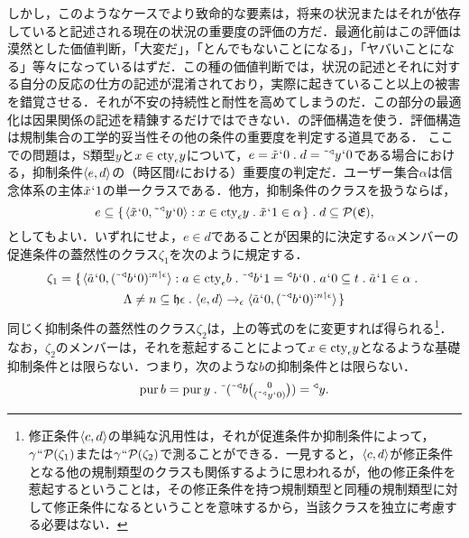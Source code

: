しかし，このようなケースでより致命的な要素は，将来の状況またはそれが依存していると記述される現在の状況の重要度の評価の方だ．最適化前はこの評価は漠然とした価値判断，「大変だ」，「とんでもないことになる」，「ヤバいことになる」等々になっているはずだ．この種の価値判断では，状況の記述とそれに対する自分の反応の仕方の記述が混淆されており，実際に起きていること以上の被害を錯覚させる．それが不安の持続性と耐性を高めてしまうのだ．この部分の最適化は因果関係の記述を精錬するだけではできない．の評価構造を使う．評価構造は規制集合の工学的妥当性その他の条件の重要度を判定する道具である．
ここでの問題は，S類型$y$と$ x\in\mathrm{cty}_{\epsilon}y $について，$ e = \tilde{x}\fap 0\con{1}d = \tildel{\trgl{y}}\fap 0 $である場合における，抑制条件$\langle e,d \rangle$の（時区間$t$における）重要度の判定だ．ユーザー集合$\alpha$は信念体系の主体$ \tilde{x}{\mspace{1mu}{`}\mspace{1mu}} 1 $の単一クラスである．他方，抑制条件のクラスを扱うならば，
\[
    e \subseteq \classab{\orp{\tilde{x}\fap 0,\tildel{\trgl{y}}\fap 0}:x\in\cty{\epsilon}y\con{1}\tilde{x}\fap 1 \in\alpha}\con{1}
    d \subseteq \mathcal{P}(\mathfrak{E}),
\]
としてもよい．いずれにせよ，$ e\in d $であることが因果的に決定する$ \alpha $メンバーの促進条件の蓋然性のクラス$\zeta_1$を次のように規定する．
\begin{multline*}
    \zeta_1 = \classab{\orp{\tilde{a}\fap 0,\prob{(\tildel{\trgl{b}}\fap 0)}{n\uphl\epsilon}}:
    a\in\cty{\epsilon}b\con{1}\tildel{\trgl{b}}\fap 1 = \trgl{b}\fap 0\con{1}
    a\fap 0\subseteq t\con{1}\tilde{a}\fap 1 \in \alpha\con{1}\\
    \Lambda\neq n\subseteq \indx{\epsilon}\con{1}
    \orp{e,d}\to_{\epsilon}\orp{\tilde{a}\fap 0,\prob{(\tildel{\trgl{b}}\fap 0)}{n\uphl\epsilon}}
    }
\end{multline*}
同じく抑制条件の蓋然性のクラス$\zeta_2$は，上の等式のをに変更すれば得られる\footnote{
    修正条件$ \langle c,d \rangle $の単純な汎用性は，それが促進条件か抑制条件によって，$\gamma{\mspace{1mu}{``}\mspace{1mu}}\mathcal{P}(\zeta_1)$または$\gamma{\mspace{1mu}{``}\mspace{1mu}}\mathcal{P}(\zeta_2)$で測ることができる．一見すると，$\langle c,d \rangle$が修正条件となる他の規制類型のクラスも関係するように思われるが，他の修正条件を惹起するということは，その修正条件を持つ規制類型と同種の規制類型に対して修正条件になるということを意味するから，当該クラスを独立に考慮する必要はない．
}．
なお，$\zeta_2$のメンバーは，それを惹起することによって$x\in\mathrm{cty}_{\epsilon}y$となるような基礎抑制条件とは限らない．つまり，次のような$b$の抑制条件とは限らない．
\[
    \mathrm{pur}\,b = \mathrm{pur}\,y\con{1}\tildel{(\tildel{\trgl{b}}\tbinom{0}{(\tildel{\trgl{y}}\fap 0)})} = \trgl{y}.
\]
